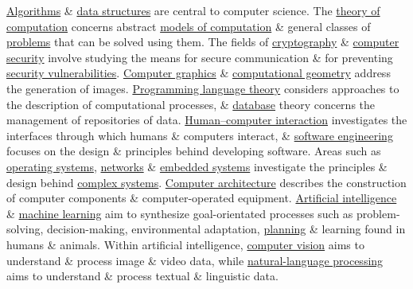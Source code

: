 \documentclass[oneside]{book}
\numberwithin{equation}{section}
\begin{document}
\href{https://en.wikipedia.org/wiki/Algorithm}{Algorithms} \& \href{https://en.wikipedia.org/wiki/Data_structures}{data structures} are central to computer science. The \href{https://en.wikipedia.org/wiki/Theory_of_computation}{theory of computation} concerns abstract \href{https://en.wikipedia.org/wiki/Models_of_computation}{models of computation} \& general classes of \href{https://en.wikipedia.org/wiki/Computational_problem}{problems} that can be solved using them. The fields of \href{https://en.wikipedia.org/wiki/Cryptography}{cryptography} \& \href{https://en.wikipedia.org/wiki/Computer_security}{computer security} involve studying the means for secure communication \& for preventing \href{https://en.wikipedia.org/wiki/Vulnerability_(computing)}{security vulnerabilities}. \href{https://en.wikipedia.org/wiki/Computer_graphics_(computer_science)}{Computer graphics} \& \href{https://en.wikipedia.org/wiki/Computational_geometry}{computational geometry} address the generation of images. \href{https://en.wikipedia.org/wiki/Programming_language_theory}{Programming language theory} considers approaches to the description of computational processes, \& \href{https://en.wikipedia.org/wiki/Database}{database} theory concerns the management of repositories of data. \href{https://en.wikipedia.org/wiki/Human%E2%80%93computer_interaction}{Human--computer interaction} investigates the interfaces through which humans \& computers interact, \& \href{https://en.wikipedia.org/wiki/Software_engineering}{software engineering} focuses on the design \& principles behind developing software. Areas such as \href{https://en.wikipedia.org/wiki/Operating_system}{operating systems}, \href{https://en.wikipedia.org/wiki/Computer_network}{networks} \& \href{https://en.wikipedia.org/wiki/Embedded_system}{embedded systems} investigate the principles \& design behind \href{https://en.wikipedia.org/wiki/Complex_systems}{complex systems}. \href{https://en.wikipedia.org/wiki/Computer_architecture}{Computer architecture} describes the construction of computer components \& computer-operated equipment. \href{https://en.wikipedia.org/wiki/Artificial_intelligence}{Artificial intelligence} \& \href{https://en.wikipedia.org/wiki/Machine_learning}{machine learning} aim to synthesize goal-orientated processes such as problem-solving, decision-making, environmental adaptation, \href{https://en.wikipedia.org/wiki/Automated_planning_and_scheduling}{planning} \& learning found in humans \& animals. Within artificial intelligence, \href{https://en.wikipedia.org/wiki/Computer_vision}{computer vision} aims to understand \& process image \& video data, while \href{https://en.wikipedia.org/wiki/Natural-language_processing}{natural-language processing} aims to understand \& process textual \& linguistic data.
\end{document}
